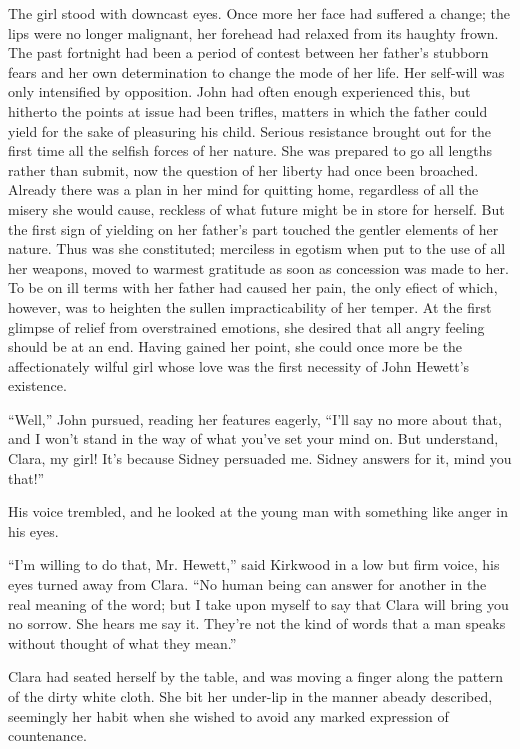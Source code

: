 The girl stood with downcast eyes. Once more her face had suffered a
change; the lips were no longer malignant, her forehead had relaxed from
its haughty frown. The past fortnight had been a period of contest
between her father's stubborn fears and her own determination to change
the mode of her life. Her self-will was only intensified by opposition.
John had often enough experienced this, but hitherto the points at
{\protect\hypertarget{67}{}{}}issue had been trifles, matters in which
the father could yield for the sake of pleasuring his child. Serious
resistance brought out for the first time all the selfish forces of her
nature. She was prepared to go all lengths rather than submit, now the
question of her liberty had once been broached. Already there was a plan
in her mind for quitting home, regardless of all the misery she would
cause, reckless of what future might be in store for herself. But the
first sign of yielding on her father's part touched the gentler elements
of her nature. Thus was she constituted; merciless in egotism when put
to the use of all her weapons, moved to warmest gratitude as soon as
concession was made to her. To be on ill terms with her father had
caused her pain, the only efiect of which, however, was to heighten the
sullen impracticability of her temper. At the first glimpse of relief
from overstrained emotions, she desired that all angry feeling should be
at an end. Having gained her point, she could once more be the
{\protect\hypertarget{68}{}{}}affectionately wilful girl whose love was
the first necessity of John Hewett's existence.

``Well,'' John pursued, reading her features eagerly, ``I'll say no more
about that, and I won't stand in the way of what you've set your mind
on. But understand, Clara, my girl! It's because Sidney persuaded me.
Sidney answers for it, mind you that!''

His voice trembled, and he looked at the young man with something like
anger in his eyes.

``I'm willing to do that, Mr. Hewett,'' said Kirkwood in a low but firm
voice, his eyes turned away from Clara. ``No human being can answer for
another in the real meaning of the word; but I take upon myself to say
that Clara will bring you no sorrow. She hears me say it. They're not
the kind of words that a man speaks without thought of what they mean.''

Clara had seated herself by the table, and was moving a finger along the
pattern of the dirty white cloth. She bit her under-lip in the manner
abeady described, seemingly {\protect\hypertarget{69}{}{}}her habit when
she wished to avoid any marked expression of countenance.

